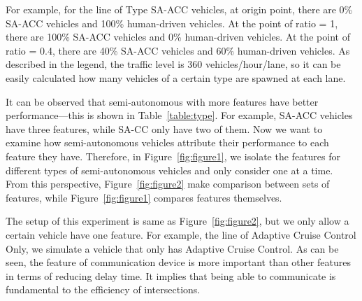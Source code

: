 For example, for the line of Type SA-ACC vehicles, at origin point,
there are 0\% SA-ACC vehicles and 100\% human-driven vehicles. At the
point of ratio = 1, there are 100\% SA-ACC vehicles and 0\%
human-driven vehicles. At the point of ratio = 0.4, there are 40\%
SA-ACC vehicles and 60\% human-driven vehicles. As described in the
legend, the traffic level is 360 vehicles/hour/lane, so it can be
easily calculated how many vehicles of a certain type are spawned at
each lane.

It can be observed that semi-autonomous with more features have better
performance---this is shown in Table~\ref{table:type}. For example,
SA-ACC vehicles have three features, while SA-CC only have two of
them. Now we want to examine how semi-autonomous vehicles attribute
their performance to each feature they have. Therefore, in
Figure~\ref{fig:figure1}, we isolate the features for different types
of semi-autonomous vehicles and only consider one at a time. From this
perspective, Figure~\ref{fig:figure2} make comparison between sets of
features, while Figure~\ref{fig:figure1} compares features themselves.

The setup of this experiment is same as Figure~\ref{fig:figure2}, but
we only allow a certain vehicle have one feature. For example, the
line of Adaptive Cruise Control Only, we simulate a vehicle that only
has Adaptive Cruise Control.  As can be seen, the feature of
communication device is more important than other features in terms of
reducing delay time.  It implies that being able to communicate
is fundamental to the efficiency of intersections.




